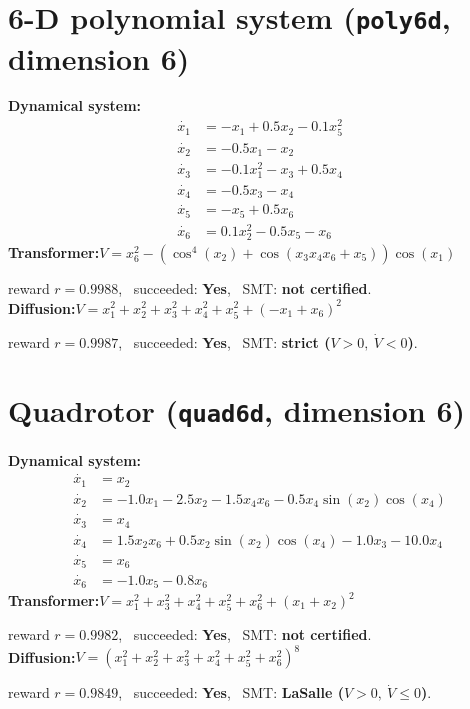 \documentclass[11pt]{article}
\begin{document}
\section*{6-D polynomial system \quad (\texttt{poly6d}, dimension 6)}
\textbf{Dynamical system:}
\begin{align*}
\dot{x_{1}} &= - x_{1} + 0.5 x_{2} - 0.1 x_{5}^{2} \\
\dot{x_{2}} &= - 0.5 x_{1} - x_{2} \\
\dot{x_{3}} &= - 0.1 x_{1}^{2} - x_{3} + 0.5 x_{4} \\
\dot{x_{4}} &= - 0.5 x_{3} - x_{4} \\
\dot{x_{5}} &= - x_{5} + 0.5 x_{6} \\
\dot{x_{6}} &= 0.1 x_{2}^{2} - 0.5 x_{5} - x_{6} 
\end{align*}
\textbf{Transformer:}\quad $V = x_{6}^{2} - \left(\cos^{4}{\left(x_{2} \right)} + \cos{\left(x_{3} x_{4} x_{6} + x_{5} \right)}\right) \cos{\left(x_{1} \right)}$
\par\noindent\hspace{1em}reward $r=0.9988$, \ succeeded: \textbf{Yes}, \ SMT: \textbf{not certified}.\\[0.5ex]
\textbf{Diffusion:}\quad $V = x_{1}^{2} + x_{2}^{2} + x_{3}^{2} + x_{4}^{2} + x_{5}^{2} + \left(- x_{1} + x_{6}\right)^{2}$
\par\noindent\hspace{1em}reward $r=0.9987$, \ succeeded: \textbf{Yes}, \ SMT: \textbf{strict ($V>0,\ \dot V<0$)}.\\[1ex]
\section*{Quadrotor \quad (\texttt{quad6d}, dimension 6)}
\textbf{Dynamical system:}
\begin{align*}
\dot{x_{1}} &= x_{2} \\
\dot{x_{2}} &= - 1.0 x_{1} - 2.5 x_{2} - 1.5 x_{4} x_{6} - 0.5 x_{4} \sin{\left(x_{2} \right)} \cos{\left(x_{4} \right)} \\
\dot{x_{3}} &= x_{4} \\
\dot{x_{4}} &= 1.5 x_{2} x_{6} + 0.5 x_{2} \sin{\left(x_{2} \right)} \cos{\left(x_{4} \right)} - 1.0 x_{3} - 10.0 x_{4} \\
\dot{x_{5}} &= x_{6} \\
\dot{x_{6}} &= - 1.0 x_{5} - 0.8 x_{6} 
\end{align*}
\textbf{Transformer:}\quad $V = x_{1}^{2} + x_{3}^{2} + x_{4}^{2} + x_{5}^{2} + x_{6}^{2} + \left(x_{1} + x_{2}\right)^{2}$
\par\noindent\hspace{1em}reward $r=0.9982$, \ succeeded: \textbf{Yes}, \ SMT: \textbf{not certified}.\\[0.5ex]
\textbf{Diffusion:}\quad $V = \left(x_{1}^{2} + x_{2}^{2} + x_{3}^{2} + x_{4}^{2} + x_{5}^{2} + x_{6}^{2}\right)^{8}$
\par\noindent\hspace{1em}reward $r=0.9849$, \ succeeded: \textbf{Yes}, \ SMT: \textbf{LaSalle ($V>0,\ \dot V\le 0$)}.\\[1ex]
\end{document}
